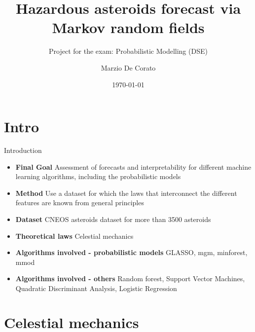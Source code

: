 \documentclass{beamer}
\title[Hazardous asteroids forecast via Markov random fields]{Hazardous asteroids forecast via Markov random fields}
\subtitle{Project for the exam: Probabilistic Modelling (DSE)}
\author{Marzio De Corato}
\date{\today}
\begin{document}
\begin{frame}
\vspace{+4 cm}  \titlepage
\end{frame}

\usebackgroundtemplate{ } 


\section{Intro}

\begin{frame}{Introduction}

\begin{itemize}
\item \textbf{Final Goal} Assessment of forecasts and interpretability for different machine learning algorithms, including the probabilistic models
\item \textbf{Method} Use a dataset for which the laws that interconnect the different features are known from general principles
\item \textbf{Dataset} CNEOS asteroids dataset for more than 3500 asteroids
\item \textbf{Theoretical laws} Celestial mechanics
\item \textbf{Algorithms involved - probabilistic models} GLASSO, mgm, minforest, mmod
\item \textbf{Algorithms involved - others} Random forest, Support Vector Machines, Quadratic Discriminant Analysis, Logistic Regression  

\end{itemize} 

\end{frame}

\section{Celestial mechanics}
\end{document}
